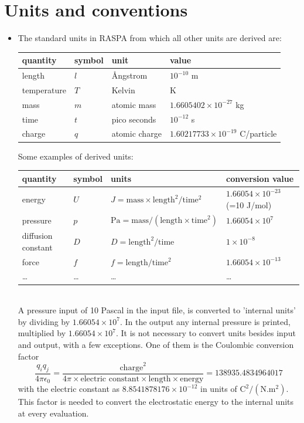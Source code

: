 \section{Units and conventions}
\begin{itemize}
\item{The standard units in RASPA from which all other units are derived are:}\\
\vskip 0.1cm
\begin{tabularx}{\linewidth}{l|l|l|l}
 quantity & symbol & unit & value\\
\hline
 length      & $l$    & \AA ngstrom   & $10^{-10}$ m\\
 temperature & $T$    & Kelvin        & K\\
 mass        & $m$    & atomic mass   & $1.6605402\times 10^{-27}$ kg\\
 time        & $t$    & pico seconds  & $10^{-12}$ s\\
 charge      & $q$    & atomic charge & $1.60217733\times 10^{-19}$ C/particle\\
\hline
\end{tabularx}
\vskip 0.1cm

\noindent Some examples of derived units:\\

\begin{tabularx}{\linewidth}{l|l|l|l}
 quantity & symbol & units & conversion value\\
\hline
 energy             & $U$    & $J=\text{mass}\times\text{length}^2/\text{time}^2$ & $1.66054\times10^{-23}$ (=10 J/mol)\\
 pressure           & $p$    & $\text{Pa}=\text{mass}/(\text{length}\times\text{time}^2)$  & $1.66054\times10^7$\\
 diffusion constant & $D$    & $D=\text{length}^2/\text{time}$ & $1\times10^{-8}$\\
 force              & $f$    & $f=\text{length}/\text{time}^2$ & $1.66054\times 10^{-13}$\\
 \dots              & \dots  & \dots                                & \dots \\
\hline
\end{tabularx}\\

A pressure input of 10 Pascal in the input file, is converted to 'internal units' by dividing by $1.66054\times10^7$. In the
output any internal pressure is printed, multiplied by $1.66054\times10^7$. It is not necessary to convert units besides
input and output, with a few exceptions. One of them is the Coulombic conversion factor
\begin{equation}
  \frac{q_i q_j}{4\pi \epsilon_0}=\frac{\text{charge}^2}{4 \pi \times \text{electric constant}\times\text{length}\times\text{energy}}=138935.4834964017
\end{equation}
with the electric constant as $8.8541878176\times10^{-12}$ in units of $\text{C}^2/(\text{N}.\text{m}^2)$. This factor is needed to convert the
electrostatic energy to the internal units at every evaluation. 


\end{itemize}
